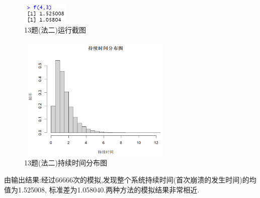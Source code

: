 \documentclass{book}
\begin{document}
\begin{figure}[H]
    \centering
    \includegraphics*[height = 1cm, width = 2.3cm]{gramFile/十三题/13题(法二)运行截图.PNG}
    \caption{13题(法二)运行截图}
\end{figure}
\begin{figure}[H]
    \centering
    \includegraphics*[height = 6cm, width = 7.5cm]{gramFile/十三题/13题(法二)持续时间分布图.PNG}
    \caption{13题(法二)持续时间分布图}
\end{figure}
\noindent
由输出结果:经过66666次的模拟,发现整个系统持续时间(首次崩溃的发生时间)的均值为1.525008,
标准差为1.058040.两种方法的模拟结果非常相近.\\

\hspace*{\fill} \\
\end{document}
